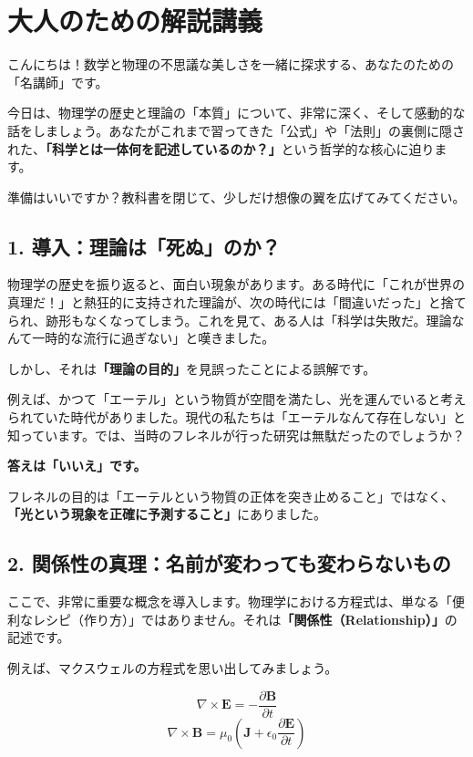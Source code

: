 \documentclass[a4paper,11pt,openany]{ltjsbook}
\begin{document}
\section{大人のための解説講義}
\begin{lecturebox}
こんにちは！数学と物理の不思議な美しさを一緒に探求する、あなたのための「名講師」です。

今日は、物理学の歴史と理論の「本質」について、非常に深く、そして感動的な話をしましょう。あなたがこれまで習ってきた「公式」や「法則」の裏側に隠された、\textbf{「科学とは一体何を記述しているのか？」}という哲学的な核心に迫ります。

準備はいいですか？教科書を閉じて、少しだけ想像の翼を広げてみてください。

\subsection*{1. 導入：理論は「死ぬ」のか？}

物理学の歴史を振り返ると、面白い現象があります。ある時代に「これが世界の真理だ！」と熱狂的に支持された理論が、次の時代には「間違いだった」と捨てられ、跡形もなくなってしまう。これを見て、ある人は「科学は失敗だ。理論なんて一時的な流行に過ぎない」と嘆きました。

しかし、それは\textbf{「理論の目的」}を見誤ったことによる誤解です。

例えば、かつて「エーテル」という物質が空間を満たし、光を運んでいると考えられていた時代がありました。現代の私たちは「エーテルなんて存在しない」と知っています。では、当時のフレネルが行った研究は無駄だったのでしょうか？

\textbf{答えは「いいえ」です。}

フレネルの目的は「エーテルという物質の正体を突き止めること」ではなく、\textbf{「光という現象を正確に予測すること」}にありました。

\subsection*{2. 関係性の真理：名前が変わっても変わらないもの}

ここで、非常に重要な概念を導入します。物理学における方程式は、単なる「便利なレシピ（作り方）」ではありません。それは\textbf{「関係性（Relationship）」}の記述です。

例えば、マクスウェルの方程式を思い出してみましょう。

$$ \nabla \times \mathbf{E} = -\frac{\partial \mathbf{B}}{\partial t} $$
$$ \nabla \times \mathbf{B} = \mu_0 \left( \mathbf{J} + \epsilon_0 \frac{\partial \mathbf{E}}{\partial t} \right) $$


\end{lecturebox}
\end{document}
